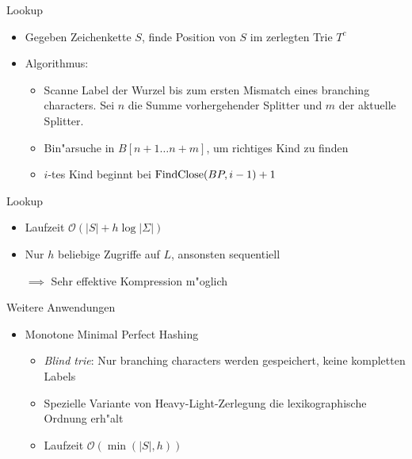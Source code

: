 \documentclass[ngerman,hyperref={pdfpagelabels=true}]{beamer}
\begin{document}
\begin{frame}{Lookup}
\centering



\begin{itemize}
\item Gegeben Zeichenkette $S$, finde Position von $S$ im zerlegten Trie $T^c$
\item Algorithmus:
\begin{itemize}
\item Scanne Label der Wurzel bis zum ersten Mismatch eines branching characters.
Sei $n$ die Summe vorhergehender Splitter und $m$ der aktuelle Splitter.
\item Bin"arsuche in $B[n+1 \ldots n+m]$, um richtiges Kind zu finden
\item $i$-tes Kind beginnt bei $\text{\lstinline|FindClose|}(BP, i - 1) + 1$
\end{itemize}

\end{itemize}
\end{frame}

\begin{frame}
\begin{block}{Lookup}
\begin{itemize}
\item Laufzeit $\mathcal{O}\left(|S| + h\log |\Sigma|\right)$
\item Nur $h$ beliebige Zugriffe auf $L$, ansonsten sequentiell
\item[$\implies$] Sehr effektive Kompression m"oglich
\end{itemize}
\end{block}

\begin{block}{Weitere Anwendungen}
\begin{itemize}
\item Monotone Minimal Perfect Hashing
\begin{itemize}
\item \emph{Blind trie}: Nur branching characters werden gespeichert, keine kompletten Labels
\item Spezielle Variante von Heavy-Light-Zerlegung die lexikographische Ordnung erh"alt
\item Laufzeit $\mathcal{O}\left(\min(|S|, h)\right)$
\end{itemize}
\end{itemize}
\end{block}
\end{frame}
\end{document}
